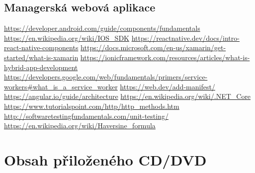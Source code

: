 \documentclass[
  biblatex,
  glossaries,
  index
]{kidiplom}
\begin{document}
\subsection{Managerská webová aplikace}

\newpage


\begin{thebibliography}{9}
     \url{https://developer.android.com/guide/components/fundamentals}
     \url{https://en.wikipedia.org/wiki/IOS_SDK}
     \url{https://reactnative.dev/docs/intro-react-native-components}
     \url{https://docs.microsoft.com/en-us/xamarin/get-started/what-is-xamarin}
     \url{https://ionicframework.com/resources/articles/what-is-hybrid-app-development}
     \url{https://developers.google.com/web/fundamentals/primers/service-workers#what_is_a_service_worker}
     \url{https://web.dev/add-manifest/}
     \url{https://angular.io/guide/architecture}
     \url{https://en.wikipedia.org/wiki/.NET_Core}
     \url{https://www.tutorialspoint.com/http/http_methods.htm}
     \url{http://softwaretestingfundamentals.com/unit-testing/}
     \url{https://en.wikipedia.org/wiki/Haversine_formula}
\end{thebibliography}


\newpage
\section{Obsah přiloženého CD/DVD} \label{sec:ObsahCD}



\printglossary


\nocite{*}
\printbibliography
\end{document}
